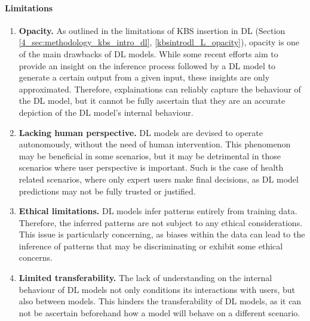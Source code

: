 \paragraph{Limitations}
\begin{enumerate} [start=1,label={\bfseries L\arabic*.}]
    \item \textbf{Opacity.} \label{kbsextradl_L_opacity} As outlined in the limitations of KBS insertion in DL (Section \ref{4_sec:methodology_kbs_intro_dl}, \ref{kbsintrodl_L_opacity}), opacity is one of the main drawbacks of DL models. While some recent efforts aim to provide an insight on the inference process followed by a DL model to generate a certain output from a given input, these insights are only approximated. Therefore, explainations can reliably capture the behaviour of the DL model, but it cannot be fully ascertain that they are an accurate depiction of the DL model's internal behaviour.

    \item \textbf{Lacking human perspective.} \label{kbsextradl_L_human} DL models are devised to operate autonomously, without the need of human intervention. This phenomenon may be beneficial in some scenarios, but it may be detrimental in those scenarios where user perspective is important. Such is the case of health related scenarios, where only expert users make final decisions, as DL model predictions may not be fully trusted or justified. 
    
    \item \textbf{Ethical limitations.} \label{kbsextradl_L_ethical} DL models infer patterns entirely from training data. Therefore, the inferred patterns are not subject to any ethical considerations. This issue is particularly concerning, as biases within the data can lead to the inference of patterns that may be discriminating or exhibit some ethical concerns.
    
    \item \textbf{Limited transferability.}\label{kbsextradl_L_transferability} The lack of understanding on the internal behaviour of DL models not only conditions its interactions with users, but also between models. This hinders the transferability of DL models, as it can not be ascertain beforehand how a model will behave on a different scenario.
\end{enumerate}

